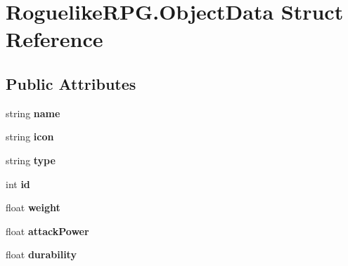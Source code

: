 \hypertarget{struct_roguelike_r_p_g_1_1_object_data}{}\section{Roguelike\+R\+P\+G.\+Object\+Data Struct Reference}
\label{struct_roguelike_r_p_g_1_1_object_data}
\subsection*{Public Attributes}
\begin{DoxyCompactItemize}
\item 
\mbox{\label{struct_roguelike_r_p_g_1_1_object_data_a9d04d55852c281b5c486605fd981b89c}} 
string {\bfseries name}
\item 
\mbox{\label{struct_roguelike_r_p_g_1_1_object_data_a91977c7e1440f1b45cbf21157c6bf592}} 
string {\bfseries icon}
\item 
\mbox{\label{struct_roguelike_r_p_g_1_1_object_data_a171db6149f363c36243d6af4bf2668ca}} 
string {\bfseries type}
\item 
\mbox{\label{struct_roguelike_r_p_g_1_1_object_data_a01cd201f5158322488b2c36055377b5d}} 
int {\bfseries id}
\item 
\mbox{\label{struct_roguelike_r_p_g_1_1_object_data_a54836cf29602cbfe97efb63626b368cf}} 
float {\bfseries weight}
\item 
\mbox{\label{struct_roguelike_r_p_g_1_1_object_data_abbd4c209666a3f8872e0d1e0e00215a8}} 
float {\bfseries attack\+Power}
\item 
\mbox{\label{struct_roguelike_r_p_g_1_1_object_data_af81679f3d09dbfc038dd535bfa6491ed}} 
float {\bfseries durability}
\item 
\mbox{\label{struct_roguelike_r_p_g_1_1_object_data_af444138d81a87453b839e3bca1c09d6d}} 

\end{DoxyCompactItemize}
